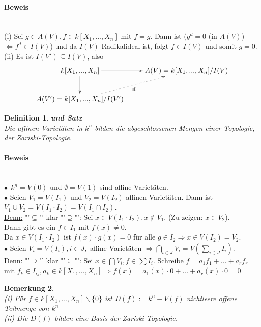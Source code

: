 \documentclass[a4paper,12pt]{report}
\theoremstyle{break}
\newtheorem{Def}{Definition}[chapter]
\newtheorem{Bem}[Def]{Bemerkung}
\theoremstyle{nonumberbreak}
\theoremstyle{nonumberplain}
\begin{document}
\paragraph{Beweis}~\\
(i) Sei $g\in A(V), f\in k[X_1,...,X_n]$ mit $\overline{f}=g$. Dann ist ($g^d=0$ (in $A(V)$) $\Leftrightarrow f^d\in I(V)$) und da $I(V)$ Radikalideal ist, folgt $f\in I(V)$ und somit $g=0$.\\
(ii) Es ist $I(V')\subseteq I(V)$, also 
\[
\begin{xy}
\xymatrix{
k[X_1,...,X_n]\ar[r]\ar[d]&A(V)=k[X_1,...,X_n]/I(V) \\
A(V')=k[X_1,...,X_n]/I(V')\ar@{.>}[ur]_{\exists !}&
}
\end{xy}
\]
\begin{Def} {\textbf{und Satz}}\\
Die affinen Varietäten in $k^n$ bilden die abgeschlossenen Mengen einer Topologie, der \underline{Zariski-Topologie}.
\end{Def}
\paragraph{Beweis}~\\
$\bullet~~ k^n=V(0)$ und $\emptyset = V(1)$ sind affine Varietäten.\\
$\bullet$ Seien $V_1=V(I_1)$ und $V_2=V(I_2)$ affinen Varietäten. Dann ist $V_1\cup V_2=V(I_1\cdot I_2)=V(I_1\cap I_2)$.\\
\underline{Denn:} "'$\subseteq$"' klar "'$\supseteq$"': Sei $x\in V(I_1\cdot I_2), x\notin V_1$. (Zu zeigen: $x\in V_2$).\\
Dann gibt es ein $f\in I_1$ mit $f(x) \neq 0$.\\
Da $x\in V(I_1\cdot I_2)$ ist $f(x)\cdot g(x)=0$ für alle $g\in I_2 \Rightarrow x\in V(I_2) = V_2$.\\
$\bullet$ Seien $V_i = V(I_i), i\in J,$ affine Varietäten $\Rightarrow \bigcap_{i\in J}V_i = V(\sum_{i\in J}I_i)$.\\
\underline{Denn:} "'$\supseteq$"' klar "'$\subseteq$"': Sei $x\in\bigcap V_i, f\in \sum I_i$. Schreibe $f=a_1f_1+...+a_rf_r$ mit $f_k\in I_{i_k}, a_k \in k[X_1,...,X_n] \Rightarrow f(x)=a_1(x) \cdot 0 +...+ a_r(x)\cdot 0 = 0$
\begin{Bem}~\\
(i) Für $f\in k[X_1,...,X_n]\backslash \{0\}$ ist $D(f):= k^n-V(f)$ nichtleere offene Teilmenge von $k^n$\\ 
(ii) Die $D(f)$ bilden eine Basis der Zariski-Topologie. 
\end{Bem}
\end{document}
